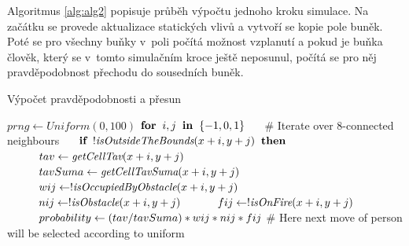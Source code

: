 \documentclass[11pt, titlepage, a4paper]{article}
\begin{document}
    Algoritmus \ref{alg:alg2} popisuje průběh výpočtu jednoho kroku simulace. Na začátku se provede aktualizace statických vlivů a vytvoří se kopie pole buněk. Poté se pro všechny buňky v~poli počítá možnost vzplanutí a pokud je buňka člověk, který se v~tomto simulačním kroce ještě neposunul, počítá se pro něj pravděpodobnost přechodu do sousedních buněk.
    
    \begin{algorithm}
    \caption{Výpočet pravděpodobnosti a přesun}\label{euclid}
    \label{alg:alg3}
    \begin{algorithmic}[1]
    \State $prng \gets \textit{Uniform}(0, 100)$
    \State $\textbf{for} \hspace*{0.2cm} i,j \hspace*{0.2cm} \textbf{in} \hspace*{0.2cm} \{-1, 0, 1\} \hspace*{0.5cm}$ \#  \hspace*{0.1cm} Iterate \hspace*{0.1cm} over \hspace*{0.1cm} 8-connected \hspace*{0.1cm} neighbours
    \State $\hspace*{0.5cm}\textbf{if}\hspace*{0.2cm}!\textit{isOutsideTheBounds}(x+i, y+j)\hspace*{0.2cm}\textbf{then}$
    \State $\hspace*{0.5cm}\hspace*{0.5cm}tav \gets \textit{getCellTav}(x+i, y+j)$
    \State $\hspace*{0.5cm}\hspace*{0.5cm}tavSuma \gets \textit{getCellTavSuma}(x+i, y+j)$
    \State $\hspace*{0.5cm}\hspace*{0.5cm}wij \gets !\textit{isOccupiedByObstacle}(x+i, y+j)$
    \State $\hspace*{0.5cm}\hspace*{0.5cm}nij \gets !\textit{isObstacle}(x+i, y+j)$
    \State $\hspace*{0.5cm}\hspace*{0.5cm}fij \gets !\textit{isOnFire}(x+i, y+j)$
    \State $\hspace*{0.5cm}\hspace*{0.5cm}probability \gets (tav / tavSuma) * wij * nij * fij$
    \State \# Here \hspace*{0.1cm} next \hspace*{0.1cm} move \hspace*{0.1cm} of \hspace*{0.1cm} person \hspace*{0.1cm} will \hspace*{0.1cm} be \hspace*{0.1cm} selected \hspace*{0.1cm} according \hspace*{0.1cm} to \hspace*{0.1cm} uniform

\end{algorithmic}
\end{algorithm}
\end{document}

